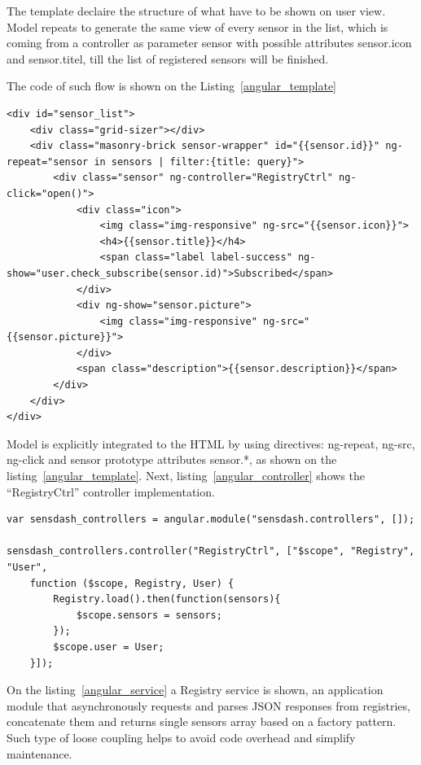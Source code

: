     The template declaire the structure of what have to be shown on user view. Model repeats to generate the same view of every sensor in the list, which is coming from a controller as parameter {{sensor}} with possible attributes {{sensor.icon}} and {{sensor.titel}}, till the list of registered sensors will be finished.

    The code of such flow is shown on the Listing~\ref{angular_template}
    \begin{lstlisting}[label=angular_template,caption=Template registry.html]
<div id="sensor_list">
    <div class="grid-sizer"></div>
    <div class="masonry-brick sensor-wrapper" id="{{sensor.id}}" ng-repeat="sensor in sensors | filter:{title: query}">
        <div class="sensor" ng-controller="RegistryCtrl" ng-click="open()">
            <div class="icon">
                <img class="img-responsive" ng-src="{{sensor.icon}}">
                <h4>{{sensor.title}}</h4>
                <span class="label label-success" ng-show="user.check_subscribe(sensor.id)">Subscribed</span>
            </div>
            <div ng-show="sensor.picture">
                <img class="img-responsive" ng-src="{{sensor.picture}}">
            </div>
            <span class="description">{{sensor.description}}</span>
        </div>
    </div>
</div>
    \end{lstlisting}

    Model is explicitly integrated to the HTML by using directives: ng-repeat, ng-src, ng-click and sensor prototype attributes {{sensor.*}}, as shown on the listing~\ref{angular_template}. Next, listing~\ref{angular_controller} shows the ``RegistryCtrl'' controller implementation.

    \begin{lstlisting}[label=angular_controller,caption=Controller controller.js]
var sensdash_controllers = angular.module("sensdash.controllers", []);

sensdash_controllers.controller("RegistryCtrl", ["$scope", "Registry", "User",
    function ($scope, Registry, User) {
        Registry.load().then(function(sensors){
            $scope.sensors = sensors;
        });
        $scope.user = User;
    }]);
    \end{lstlisting}

	On the listing~\ref{angular_service} a Registry service is shown, an application module that asynchronously requests and parses JSON responses from registries, concatenate them and returns single sensors array based on a factory pattern. Such type of loose coupling helps to avoid code overhead and simplify maintenance.  

